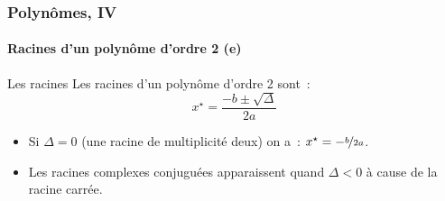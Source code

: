 \documentclass[10pt,notheorems]{beamer}
\theoremstyle{plain}
\theoremstyle{definition} %
\begin{document}
\begin{frame}
  \frametitle{Polynômes, IV}
  \framesubtitle{Racines d'un polynôme d'ordre 2 (e)}
  \hypertarget{slide_polynome_2_racines_5}{}

  \bigskip

  \begin{block}{Les racines}
    Les racines d'un polynôme d'ordre 2 sont~:
    \[
      x^{\star} = \frac{-b \pm \sqrt{\Delta}}{2a}
    \]
  \end{block}

  \bigskip

  \begin{itemize}

  \item Si $\Delta=0$ (une racine de multiplicité deux) on a~: $x^{\star} = -\nicefrac{b}{2a}$.\newline

  \item Les racines complexes conjuguées apparaissent quand $\Delta<0$ à cause de la racine carrée.\newline

  \end{itemize}

\end{frame}
\end{document}

